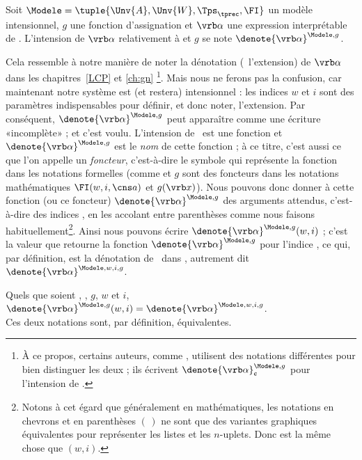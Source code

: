 \begin{nota}
Soit \(\Modele = \tuple{\Unv{A},\Unv{W}, \Tps_{\tprec},\FI}\) 
un modèle intensionnel, $g$ une fonction d'assignation
et $\vrb\alpha$ une expression interprétable de {\LO}.  L'intension de
$\vrb\alpha$ relativement à {\Modele} et $g$ se note
\(\denote{\vrb\alpha}^{\Modele,g}\).
\end{nota}




Cela ressemble à notre manière de noter la dénotation (\ie\ l'extension) de
$\vrb\alpha$ dans les chapitres~\ref{LCP} et \ref{ch:gn}%
\footnote{À ce propos, certains auteurs, comme \citet{DWP:81}, utilisent des notations différentes pour bien distinguer les deux ; ils écrivent \(\denote{\vrb\alpha}^{\Modele,g}_{\text{\textcent}}\) pour l'intension de \vrb\alpha.}.  
Mais nous ne ferons pas la confusion, car maintenant notre système est (et restera) intensionnel : les indices $w$ et $i$ sont des paramètres indispensables pour définir, et donc noter, l'extension.
Par conséquent,
\(\denote{\vrb\alpha}^{\Modele,g}\) peut apparaître comme une écriture
{«incomplète»} ; et c'est voulu.  
L'intension de \vrb\alpha\ est une fonction et \(\denote{\vrb\alpha}^{\Modele,g}\) est le \emph{nom} de cette fonction ; à ce titre, c'est aussi ce que l'on appelle un \emph{foncteur}, c'est-à-dire le symbole qui représente la fonction dans les notations formelles (comme {\FI} et $g$ sont des foncteurs dans les notations mathématiques $\FI(w,i,\cns a)$ et $g(\vrb x)$).
Nous pouvons donc donner à cette fonction (ou ce foncteur) \(\denote{\vrb\alpha}^{\Modele,g}\) des arguments attendus, c'est-à-dire des indices , en les accolant entre parenthèses comme nous faisons habituellement\footnote{Notons à cet égard que généralement en mathématiques, les notations en chevrons \tuple{\,} et en parenthèses $(\,)$ ne sont que des variantes graphiques équivalentes pour représenter les listes et les $n$-uplets. Donc  est la même chose que $(w,i)$.}. Ainsi nous pouvons écrire  \(\denote{\vrb\alpha}^{\Modele,g}(w,i)\) ; c'est la valeur que retourne la fonction \(\denote{\vrb\alpha}^{\Modele,g}\) pour l'indice , ce qui, par définition, est la dénotation de \vrb\alpha\ dans , autrement dit \(\denote{\vrb\alpha}^{\Modele,w,i,g}\).
%

\nopagebreak[2]

\begin{point}
Quels que soient \vrb\alpha, \Modele, $g$, $w$ et $i$, \(\denote{\vrb\alpha}^{\Modele,g}(w,i)=\denote{\vrb\alpha}^{\Modele,w,i,g}\).\\
Ces deux notations sont, par définition, équivalentes.
\end{point}


